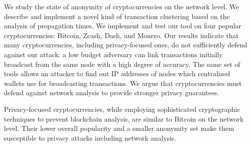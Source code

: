 We study the state of anonymity of cryptocurrencies on the network level.
We describe and implement a novel kind of transaction clustering based on the analysis of propagation times.
We implement and test our tool on four popular cryptocurrencies: Bitcoin, Zcash, Dash, and Monero.
Our results indicate that many cryptocurrencies, including privacy-focused ones, do not sufficiently defend against our attack: a low budget adversary can link transactions initially broadcast from the same node with a high degree of accuracy.
The same set of tools allows an attacker to find out IP addresses of nodes which centralized wallets use for broadcasting transactions.
We argue that cryptocurrencies must defend against network analysis to provide stronger privacy guarantees.

Privacy-focused cryptocurrencies, while employing sophisticated cryptographic techniques to prevent blockchain analysis, are similar to Bitcoin on the network level.
Their lower overall popularity and a smaller anonymity set make them susceptible to privacy attacks including network analysis.
